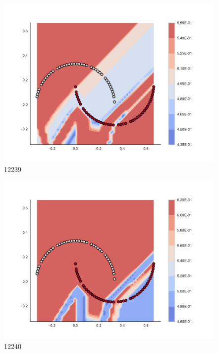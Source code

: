 \begin{subfigure}[b]{0.09\textwidth}
    \includegraphics[clip, trim=2.35cm 1.75cm 4.5cm 0cm,width=\textwidth]{img/convergence/12239.pdf}
    \caption{12239}
    \label{fig:convergence_12239}
\end{subfigure}
%
\begin{subfigure}[b]{0.09\textwidth}
    \includegraphics[clip, trim=2.35cm 1.75cm 4.5cm 0cm,width=\textwidth]{img/convergence/12240.pdf}
    \caption{12240}
    \label{fig:convergence_12240}
\end{subfigure}
%
